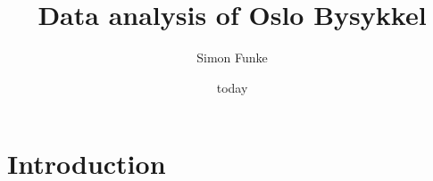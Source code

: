 \documentclass{article}
\title{Data analysis of Oslo Bysykkel}
\date{today}
\author{Simon Funke}
\begin{document}
\maketitle

\section{Introduction}


\end{document}
